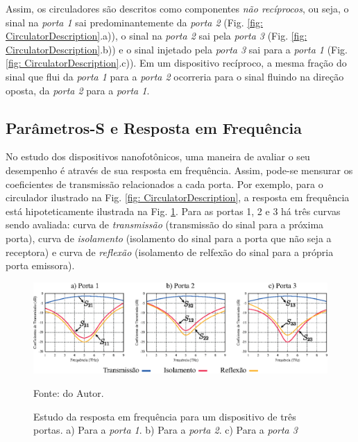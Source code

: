 Assim, os circuladores são descritos como componentes \textit{não recíprocos}, ou seja, o sinal na \textit{porta 1} sai predominantemente da \textit{porta 2} (Fig. \ref{fig: CirculatorDescription}.a)), o sinal na \textit{porta 2} sai pela \textit{porta 3} (Fig. \ref{fig: CirculatorDescription}.b)) e o sinal injetado pela \textit{porta 3} sai para a \textit{porta 1} (Fig. \ref{fig: CirculatorDescription}.c)). Em um dispositivo recíproco, a mesma fração do sinal que flui da \textit{porta 1} para a \textit{porta 2} ocorreria para o sinal fluindo na direção oposta, da \textit{porta 2} para a \textit{porta 1}.


\subsection{Parâmetros-S e Resposta em Frequência}

No estudo dos dispositivos nanofotônicos, uma maneira de avaliar o seu desempenho é através de sua resposta em frequência. Assim, pode-se mensurar os coeficientes de transmissão relacionados a cada porta. Por exemplo, para o circulador ilustrado na Fig. \ref{fig: CirculatorDescription}, a resposta em frequência está hipoteticamente ilustrada na Fig. \ref{fig: FrequencyResponseStudy}. Para as portas 1, 2 e 3 há três curvas sendo avaliada: curva de \textit{transmissão} (transmissão do sinal para a próxima porta), curva de \textit{isolamento} (isolamento do sinal para a porta que não seja a receptora) e curva de \textit{reflexão} (isolamento de relfexão do sinal para a própria porta emissora).

\begin{figure}[H]
    \centering
    \includegraphics{04-Figuras/FrequencyResponseStudy.eps}
    \caption{Estudo da resposta em frequência para um dispositivo de três portas. a) Para a \textit{porta 1}. b) Para a \textit{porta 2}. c) Para a \textit{porta 3}} \par
    Fonte: do Autor.
    \label{fig: FrequencyResponseStudy}
\end{figure}

